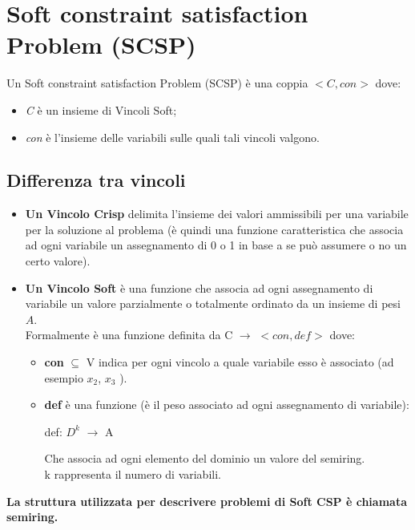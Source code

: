 \section{Soft constraint satisfaction Problem (SCSP)}
Un Soft constraint satisfaction Problem (SCSP) è una coppia $<C, con>$ dove:
\begin{itemize}
    \item \textit{C} è un insieme di Vincoli Soft;
    \item \textit{con} è l'insieme delle variabili sulle quali tali vincoli
          valgono.
\end{itemize}

\subsection{Differenza tra vincoli}
\begin{itemize}
    \item \textbf{Un Vincolo Crisp} delimita l'insieme dei valori ammissibili
          per una variabile per la soluzione al problema (è quindi una funzione
          caratteristica che associa ad ogni variabile un assegnamento di 0 o 1 in
          base a se può assumere o no un certo valore).
    \item \textbf{Un Vincolo Soft} è una funzione che associa ad ogni
          assegnamento di variabile un valore parzialmente o totalmente ordinato
          da un insieme di pesi $A$.
          \\Formalmente è una funzione definita da C $\rightarrow$
          $<con, def>$ dove:

          \begin{itemize}
              \item \textbf{con} $\subseteq$ V indica per ogni vincolo a quale
                    variabile esso è associato (ad esempio $x_2 $, $x_3$ ).
              \item \textbf{def} è una funzione (è il peso associato ad ogni
                    assegnamento di variabile):
                    \begin{center}
                        def: $D^k$ $\rightarrow$ A
                    \end{center}
                    Che associa ad ogni elemento del dominio un valore del
                    semiring. \\k rappresenta il numero di variabili.
          \end{itemize}
\end{itemize}
\textbf{La struttura utilizzata per descrivere problemi di Soft CSP è chiamata semiring.}

